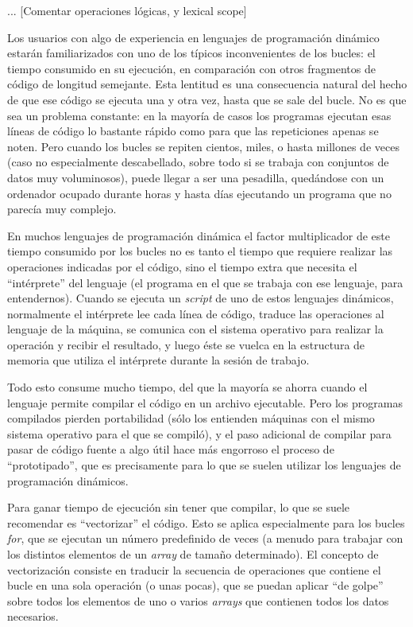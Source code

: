 ﻿\documentclass[spanish]{article}
\begin{document}
...
[Comentar operaciones lógicas, y lexical scope]

Los usuarios con algo de experiencia en lenguajes de programación
dinámico estarán familiarizados con uno de los típicos inconvenientes
de los bucles: el tiempo consumido en su ejecución, en comparación con otros
fragmentos de código de longitud semejante. Esta lentitud es una
consecuencia natural del hecho de que ese código se ejecuta una y otra vez,
hasta que se sale del bucle. No es que sea un problema constante:
en la mayoría de casos los programas ejecutan esas líneas de código lo
bastante rápido como para que las repeticiones apenas se noten. Pero
cuando los bucles se repiten cientos, miles, o hasta millones de veces
(caso no especialmente descabellado, sobre todo si se trabaja con
conjuntos de datos muy voluminosos), puede llegar a ser una pesadilla,
quedándose con un ordenador ocupado durante horas y hasta días
ejecutando un programa que no parecía muy complejo.

En muchos lenguajes de programación dinámica
el factor multiplicador de este tiempo consumido por los bucles no
es tanto el tiempo que requiere realizar las operaciones indicadas por
el código, sino el tiempo extra que necesita el ``intérprete'' del lenguaje
(el programa en el que se trabaja con ese lenguaje, para entendernos).
Cuando se ejecuta un \emph{script} de uno de estos lenguajes dinámicos,
normalmente el intérprete lee cada línea de código, traduce las operaciones al
lenguaje de la máquina, se comunica con el sistema operativo para
realizar la operación y recibir el resultado, y luego éste se vuelca en la
estructura de memoria que utiliza el intérprete durante la sesión de trabajo.

Todo esto consume mucho tiempo, del que la mayoría se ahorra cuando el lenguaje
permite compilar el código en un archivo ejecutable. Pero los programas
compilados pierden portabilidad (sólo los entienden máquinas con el
mismo sistema operativo para el que se compiló), y el paso adicional
de compilar para pasar de código fuente a algo útil hace más engorroso
el proceso de ``prototipado'', que es precisamente para lo que se suelen
utilizar los lenguajes de programación dinámicos.

Para ganar tiempo de ejecución sin tener que compilar, lo que se suele
recomendar es ``vectorizar'' el código. Esto se aplica especialmente para
los bucles \emph{for}, que se ejecutan un número predefinido de veces
(a menudo para trabajar con los distintos elementos de un \emph{array}
de tamaño determinado). El concepto de vectorización consiste en
traducir la secuencia de operaciones que contiene el bucle en una sola
operación (o unas pocas), que se puedan aplicar ``de golpe'' sobre todos los 
elementos de uno o varios \emph{arrays} que contienen todos los datos
necesarios.
\end{document}
